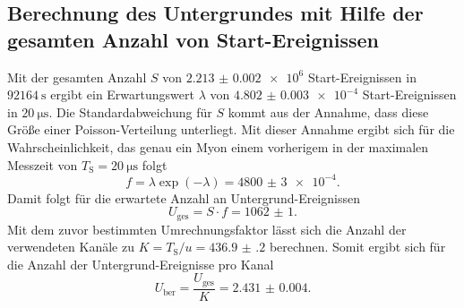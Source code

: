 \subsection{Berechnung des Untergrundes mit Hilfe der gesamten Anzahl von Start-Ereignissen}
\label{subsec:Berechnung}
Mit der gesamten Anzahl $S$ von $\num{2.213(2)e6}$ Start-Ereignissen in $\SI{92164}{\second}$ ergibt ein Erwartungswert $\lambda$ von $\num{4.802(3)e-4}$ Start-Ereignissen in $\SI{20}{\micro\second}$. Die Standardabweichung für $S$ kommt aus der Annahme, dass diese Größe einer Poisson-Verteilung unterliegt. Mit dieser Annahme ergibt sich für die Wahrscheinlichkeit, das genau ein Myon einem vorherigem in der maximalen Messzeit von $T_\text{S}=\SI{20}{\micro\second}$ folgt 
\begin{displaymath}
f=\lambda \exp(-\lambda)=\num{4800(3)e-4}.
\end{displaymath}
Damit folgt für die erwartete Anzahl an Untergrund-Ereignissen
\begin{displaymath}
U_\text{ges}=S \cdot f =\num{1062(1)}.
\end{displaymath}
Mit dem zuvor bestimmten Umrechnungsfaktor lässt sich die Anzahl der verwendeten Kanäle zu $K=T_\text{S} / u=\num{436.9(2)}$ berechnen.
Somit ergibt sich für die Anzahl der Untergrund-Ereignisse pro Kanal
\begin{displaymath}
U_\text{ber}=\frac{U_\text{ges}}{K} =\num{2.431(4)}.
\end{displaymath}


